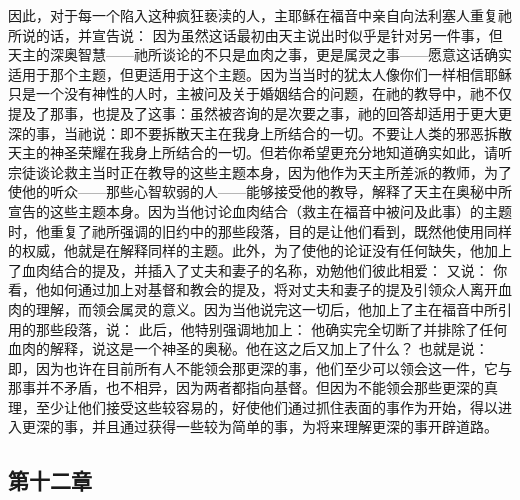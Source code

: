 \par

因此，对于每一个陷入这种疯狂亵渎的人，主耶稣在福音中亲自向法利塞人重复祂所说的话，并宣告说： 因为虽然这话最初由天主说出时似乎是针对另一件事，但天主的深奥智慧——祂所谈论的不只是血肉之事，更是属灵之事——愿意这话确实适用于那个主题，但更适用于这个主题。因为当当时的犹太人像你们一样相信耶稣只是一个没有神性的人时，主被问及关于婚姻结合的问题，在祂的教导中，祂不仅提及了那事，也提及了这事：虽然被咨询的是次要之事，祂的回答却适用于更大更深的事，当祂说：即不要拆散天主在我身上所结合的一切。不要让人类的邪恶拆散天主的神圣荣耀在我身上所结合的一切。但若你希望更充分地知道确实如此，请听宗徒谈论救主当时正在教导的这些主题本身，因为他作为天主所差派的教师，为了使他的听众——那些心智软弱的人——能够接受他的教导，解释了天主在奥秘中所宣告的这些主题本身。因为当他讨论血肉结合（救主在福音中被问及此事）的主题时，他重复了祂所强调的旧约中的那些段落，目的是让他们看到，既然他使用同样的权威，他就是在解释同样的主题。此外，为了使他的论证没有任何缺失，他加上了血肉结合的提及，并插入了丈夫和妻子的名称，劝勉他们彼此相爱： 又说： 你看，他如何通过加上对基督和教会的提及，将对丈夫和妻子的提及引领众人离开血肉的理解，而领会属灵的意义。因为当他说完这一切后，他加上了主在福音中所引用的那些段落，说： 此后，他特别强调地加上： 他确实完全切断了并排除了任何血肉的解释，说这是一个神圣的奥秘。他在这之后又加上了什么？ 也就是说：即，因为也许在目前所有人不能领会那更深的事，他们至少可以领会这一件，它与那事并不矛盾，也不相异，因为两者都指向基督。但因为不能领会那些更深的真理，至少让他们接受这些较容易的，好使他们通过抓住表面的事作为开始，得以进入更深的事，并且通过获得一些较为简单的事，为将来理解更深的事开辟道路。\par


\subsection{第十二章}

